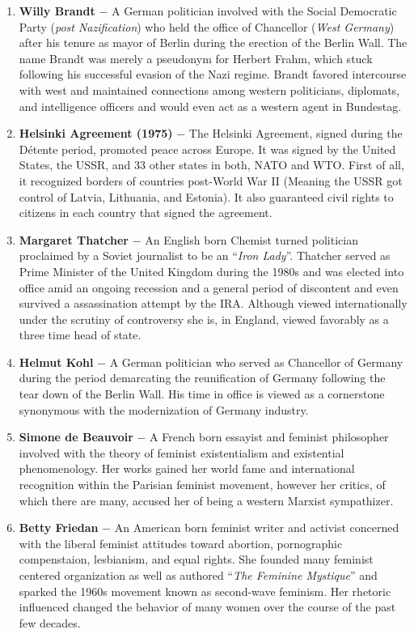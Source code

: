 \documentclass[12pt]{article}
\begin{document}
\begin{flushleft}
\begin{enumerate}
    \item \textbf{Willy Brandt} $-$ A German politician involved with the Social Democratic Party (\emph{post Nazification}) who held the office of Chancellor (\emph{West Germany}) after his tenure as mayor of Berlin during the erection of the Berlin Wall. The name Brandt was merely a pseudonym for Herbert Frahm, which stuck following his successful evasion of the Nazi regime. Brandt favored intercourse with west and maintained connections among western politicians, diplomats, and intelligence officers and would even act as a western agent in Bundestag.

    \item \textbf{Helsinki Agreement (1975)} $-$ The Helsinki Agreement, signed during the D\'etente period, promoted peace across Europe. It was signed by the United States, the USSR, and 33 other states in both, NATO and WTO. First of all, it recognized borders of countries post-World War II (Meaning the USSR got control of Latvia, Lithuania, and Estonia). It also guaranteed civil rights to citizens in each country that signed the agreement. 

    \item \textbf{Margaret Thatcher} $-$ An English born Chemist turned politician proclaimed by a Soviet journalist to be an ``\emph{Iron Lady}''. Thatcher served as Prime Minister of the United Kingdom during the 1980s and was elected into office amid an ongoing recession and a general period of discontent and even survived a assassination attempt by the IRA. Although viewed internationally under the scrutiny of controversy she is, in England, viewed favorably as a three time head of state.    

    \item \textbf{Helmut Kohl} $-$ A German politician who served as Chancellor of Germany during the period demarcating the reunification of Germany following the tear down of the Berlin Wall. His time in office is viewed as a cornerstone synonymous with the modernization of Germany industry.

    \item \textbf{Simone de Beauvoir} $-$ A French born essayist and feminist philosopher involved with the theory of feminist existentialism and existential phenomenology. Her works gained her world fame and international recognition within the Parisian feminist movement, however her critics, of which there are many, accused her of being a western Marxist sympathizer.

    \item \textbf{Betty Friedan} $-$ An American born feminist writer and activist concerned with the liberal feminist attitudes toward abortion, pornographic compenstaion, lesbianism, and equal rights. She founded many feminist centered organization as well as authored ``\emph{The Feminine Mystique}'' and sparked the 1960s movement known as second-wave feminism. Her rhetoric influenced changed the behavior of many women over the course of the past few decades.


\end{enumerate}
\end{flushleft}
\end{document}
